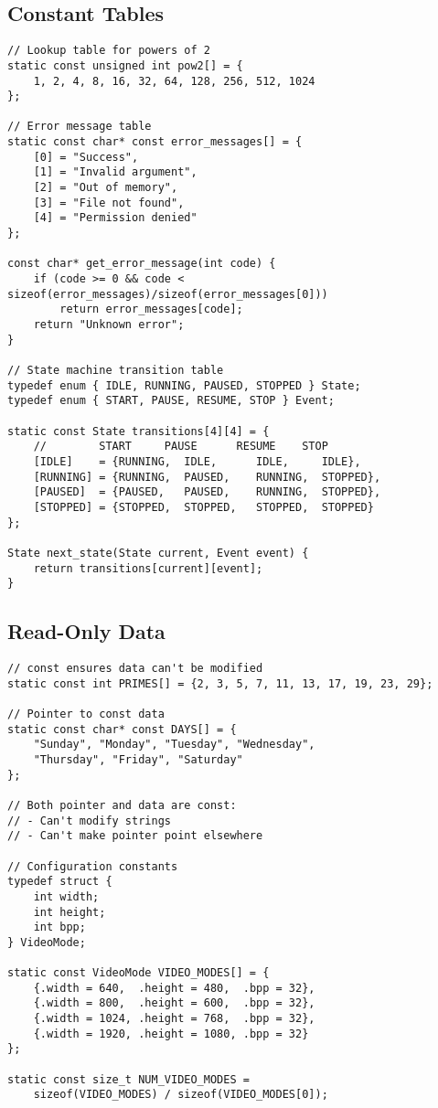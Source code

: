 \subsection{Constant Tables}

\begin{lstlisting}
// Lookup table for powers of 2
static const unsigned int pow2[] = {
    1, 2, 4, 8, 16, 32, 64, 128, 256, 512, 1024
};

// Error message table
static const char* const error_messages[] = {
    [0] = "Success",
    [1] = "Invalid argument",
    [2] = "Out of memory",
    [3] = "File not found",
    [4] = "Permission denied"
};

const char* get_error_message(int code) {
    if (code >= 0 && code < sizeof(error_messages)/sizeof(error_messages[0]))
        return error_messages[code];
    return "Unknown error";
}

// State machine transition table
typedef enum { IDLE, RUNNING, PAUSED, STOPPED } State;
typedef enum { START, PAUSE, RESUME, STOP } Event;

static const State transitions[4][4] = {
    //        START     PAUSE      RESUME    STOP
    [IDLE]    = {RUNNING,  IDLE,      IDLE,     IDLE},
    [RUNNING] = {RUNNING,  PAUSED,    RUNNING,  STOPPED},
    [PAUSED]  = {PAUSED,   PAUSED,    RUNNING,  STOPPED},
    [STOPPED] = {STOPPED,  STOPPED,   STOPPED,  STOPPED}
};

State next_state(State current, Event event) {
    return transitions[current][event];
}
\end{lstlisting}

\subsection{Read-Only Data}

\begin{lstlisting}
// const ensures data can't be modified
static const int PRIMES[] = {2, 3, 5, 7, 11, 13, 17, 19, 23, 29};

// Pointer to const data
static const char* const DAYS[] = {
    "Sunday", "Monday", "Tuesday", "Wednesday",
    "Thursday", "Friday", "Saturday"
};

// Both pointer and data are const:
// - Can't modify strings
// - Can't make pointer point elsewhere

// Configuration constants
typedef struct {
    int width;
    int height;
    int bpp;
} VideoMode;

static const VideoMode VIDEO_MODES[] = {
    {.width = 640,  .height = 480,  .bpp = 32},
    {.width = 800,  .height = 600,  .bpp = 32},
    {.width = 1024, .height = 768,  .bpp = 32},
    {.width = 1920, .height = 1080, .bpp = 32}
};

static const size_t NUM_VIDEO_MODES =
    sizeof(VIDEO_MODES) / sizeof(VIDEO_MODES[0]);
\end{lstlisting}

